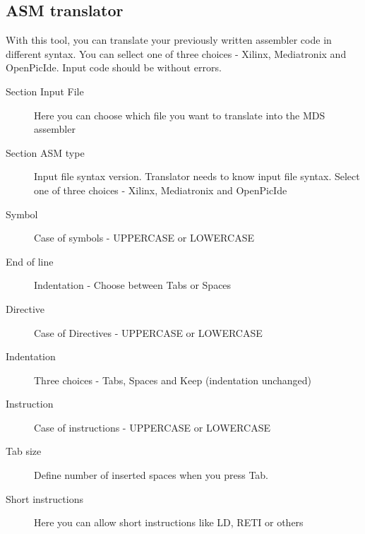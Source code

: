                 \subsection{ASM translator}
                    With this tool, you can translate your previously written assembler code in different syntax.
                    You can sellect one of three choices - Xilinx, Mediatronix and OpenPicIde. Input code should be without
                    errors.
                    \begin{description}
                        \item[Section Input File] Here you can choose which file you want to translate into the MDS assembler
                        \item[Section ASM type] Input file syntax version. Translator needs to know input file syntax. Select one of three choices - Xilinx, Mediatronix and OpenPicIde
                        \item[Symbol] Case of symbols - UPPERCASE or LOWERCASE
                        \item[End of line] Indentation - Choose between Tabs or Spaces
                        \item[Directive] Case of Directives - UPPERCASE or LOWERCASE
                        \item[Indentation] Three choices - Tabs, Spaces and Keep (indentation unchanged)
                        \item[Instruction] Case of instructions - UPPERCASE or LOWERCASE
                        \item[Tab size]  Define number of inserted spaces when you press Tab.
                        \item[Short instructions] Here you can allow short instructions like LD, RETI or others
                    \end{description}

